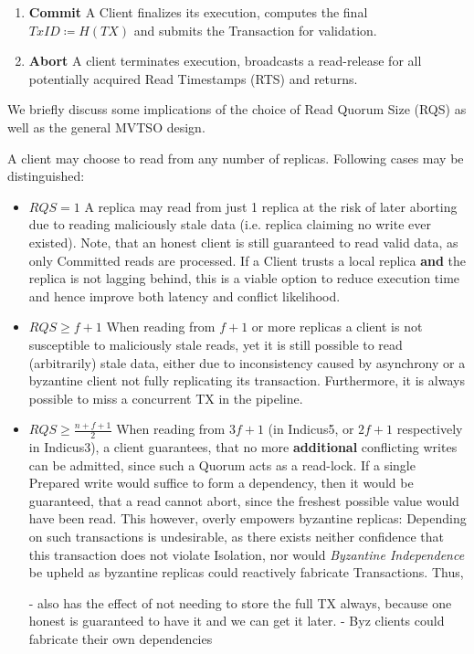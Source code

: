 \begin{enumerate}
\item \textbf{Commit} A Client finalizes its execution, computes the final $TxID \coloneqq H(TX)$  and submits the Transaction for validation.

\item \textbf{Abort} A client terminates execution, broadcasts a read-release for all potentially acquired Read Timestamps (RTS) and returns.

\end{enumerate}

 
We briefly discuss some implications of the choice of Read Quorum Size (RQS) as well as the general MVTSO design.
 
A client may choose to read from any number of replicas. Following cases may be distinguished:
\begin{itemize}
\item \textbf{$RQS = 1$} A replica may read from just 1 replica at the risk of later aborting due to reading maliciously stale data (i.e. replica claiming no write ever existed). Note, that an honest client is still guaranteed to read valid data, as only Committed reads are processed. If a Client trusts a local replica \textbf{and} the replica is not lagging behind, this is a viable option to reduce execution time and hence improve both latency and conflict likelihood.
\item \textbf{$RQS \geq f+1$} When reading from $f+1$ or more replicas a client is not susceptible to maliciously stale reads, yet it is still possible to read (arbitrarily) stale data, either due to inconsistency caused by asynchrony or a byzantine client not fully replicating its transaction. Furthermore, it is always possible to miss a concurrent TX in the pipeline.
\item \textbf{$RQS \geq \frac{n+f+1}{2}$} When reading from $3f+1$ (in Indicus5, or $2f+1$ respectively in Indicus3), a client guarantees, that no more \textbf{additional} conflicting writes can be admitted, since such a Quorum acts as a read-lock. If a single Prepared write would suffice to form a dependency, then it would be guaranteed, that a read cannot abort, since the freshest possible value would have been read. This however, overly empowers byzantine replicas:  Depending on such transactions is undesirable, as there exists neither confidence that this transaction does not violate Isolation, nor would \textit{Byzantine Independence} be upheld as byzantine replicas could reactively fabricate Transactions. Thus, 

- also has the effect of not needing to store the full TX always, because one honest is guaranteed to have it and we can get it later.
- Byz clients could fabricate their own dependencies 
\end{itemize}

